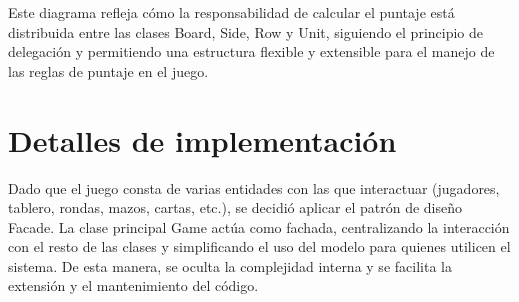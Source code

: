\documentclass[titlepage,a4paper]{article}
\begin{document}
Este diagrama refleja cómo la responsabilidad de calcular el puntaje está distribuida entre las clases Board, Side, Row y Unit, siguiendo el principio de delegación y permitiendo una estructura flexible y extensible para el manejo de las reglas de puntaje en el juego.


\section{Detalles de implementación}\label{sec:implementacion}

Dado que el juego consta de varias entidades con las que interactuar (jugadores, tablero, rondas, mazos, cartas, etc.), se decidió aplicar el patrón de diseño Facade. La clase principal Game actúa como fachada, centralizando la interacción con el resto de las clases y simplificando el uso del modelo para quienes utilicen el sistema. De esta manera, se oculta la complejidad interna y se facilita la extensión y el mantenimiento del código.

\end{document}
